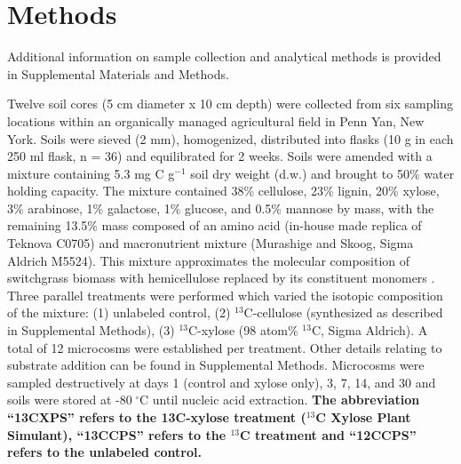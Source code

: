 \section{Methods}
Additional information on sample collection and analytical methods is provided
in Supplemental Materials and Methods. 

Twelve soil cores (5 cm diameter x 10 cm depth) were collected from six 
sampling locations within an organically managed agricultural field in Penn
Yan, New York. Soils were sieved (2 mm), homogenized, distributed into flasks
(10 g in each 250 ml flask, n = 36) and equilibrated for 2 weeks. Soils were
amended with a mixture containing 5.3 mg C g$^{-1}$ soil dry weight (d.w.) and
brought to 50\% water holding capacity. The mixture contained 38\% cellulose,
23\% lignin, 20\% xylose, 3\% arabinose, 1\% galactose, 1\% glucose, and 0.5\%
mannose by mass, with the remaining 13.5\% mass composed of an amino acid
(in-house made replica of Teknova C0705) and macronutrient mixture (Murashige
and Skoog, Sigma Aldrich M5524).  This mixture approximates the molecular
composition of switchgrass biomass with hemicellulose replaced by its
constituent monomers \citep{Schneckenberger_2008}. Three parallel
treatments were performed which varied the isotopic composition of the mixture:
(1) unlabeled control, (2) $^{13}$C-cellulose (synthesized as described in
Supplemental Methods), (3) $^{13}$C-xylose (98 atom\% $^{13}$C, Sigma Aldrich).
A total of 12 microcosms were established per treatment. Other details relating
to substrate addition can be found in Supplemental Methods. Microcosms were
sampled destructively at days 1 (control and xylose only), 3, 7, 14, and 30 and
soils were stored at -80 $^{\circ}$C until nucleic acid extraction. \textbf{
The abbreviation “13CXPS” refers to the 13C-xylose treatment ($^{13}$C Xylose
Plant Simulant), “13CCPS” refers to the $^{13}$C treatment and “12CCPS” refers
to the unlabeled control.}

